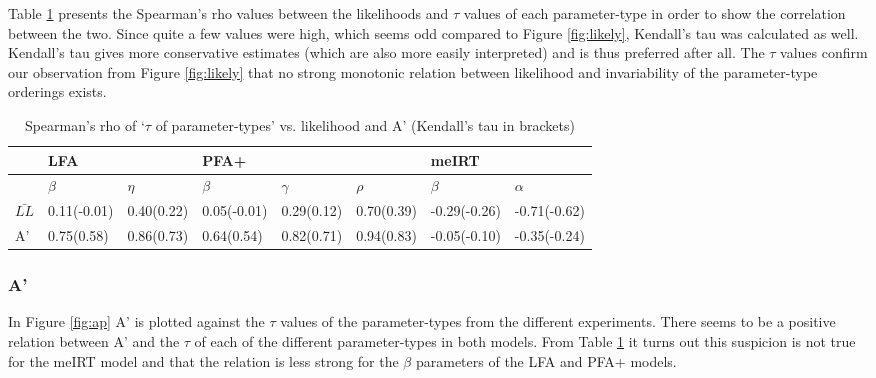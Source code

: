 \documentclass{scrartcl}
\begin{document}
Table \ref{tab:cor} presents the Spearman's rho values between the likelihoods and $\tau$ values of each parameter-type in order to show the correlation between the two. Since quite a few values were high, which seems odd compared to Figure \ref{fig:likely}, Kendall's tau was calculated as well.  Kendall's tau gives more conservative estimates (which are also more easily interpreted) and is thus preferred after all. The $\tau$ values confirm our observation from Figure \ref{fig:likely} that no strong monotonic relation between likelihood and invariability of the parameter-type orderings exists.


\begin{table}[h]
\centering
\begin{tabular}{| l || l | l ||l|l |l||l|l|}

    \hline
     & LFA  & & PFA+ & & &meIRT &   \\ \hline
     & $\beta$ & $\eta$ & $\beta$ & $\gamma$ & $\rho$ & $\beta$ & $\alpha$  \\ \hline
    $\bar{LL}$     & 0.11(-0.01) & 0.40(0.22) & 0.05(-0.01) & 0.29(0.12) & 0.70(0.39) & -0.29(-0.26)&-0.71(-0.62) \\ \hline
    A'             & 0.75(0.58) & 0.86(0.73) & 0.64(0.54) & 0.82(0.71) & 0.94(0.83) & -0.05(-0.10)&-0.35(-0.24) \\ \hline

    \hline
\end{tabular}
\caption{Spearman's rho of `$\tau$ of parameter-types' vs. likelihood and A' (Kendall's tau in brackets)}
\label{tab:cor}
\end{table}


\subsubsection{A'}
In Figure \ref{fig:ap} A' is plotted against the $\tau$ values of the parameter-types from the different experiments. There seems to be a positive relation between A' and the $\tau$ of each of the different parameter-types in both models. From Table \ref{tab:cor} it turns out this suspicion is not true for the meIRT model and that the relation is less strong for the $\beta$ parameters of the LFA and PFA+ models.
\end{document}
